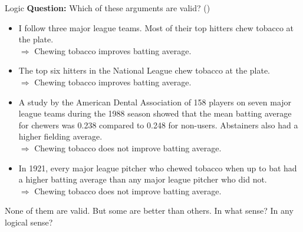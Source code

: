 \documentclass[8pt]{beamer}\usepackage[]{graphicx}\usepackage[]{color}
\begin{document}
\begin{frame}{Logic}
%
\textbf{Question:} Which of these arguments are valid?
(\cite[Ch.1 Question 7]{hacking:2001:introduction})

%
\begin{itemize}
%
\item I follow three major league teams.  Most of their top hitters chew
tobacco at the plate.\\
$\Rightarrow$ Chewing tobacco improves batting average.
%
\item The top six hitters in the National League chew tobacco at the plate.\\
$\Rightarrow$ Chewing tobacco improves batting average.
%
\item A study by the American Dental Association of 158 players on
seven major league teams during the 1988 season showed that the mean batting
average for chewers was 0.238 compared to 0.248 for non-users.  Abstainers
also had a higher fielding average.\\
$\Rightarrow$ Chewing tobacco does not improve batting average.
%
\item In 1921, every major league pitcher who chewed tobacco when up to
bat had a higher batting average than any major league pitcher who did
not.\\
$\Rightarrow$ Chewing tobacco does not improve batting average.
%
\end{itemize}
%
\pause

None of them are valid. But some are better than others. In what sense?  In any
logical sense?
%
\end{frame}


\end{document}
